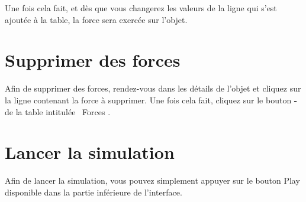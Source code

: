 \documentclass[11pt]{report}
\begin{document}
Une fois cela fait, et dès que vous changerez les valeurs de la ligne qui s'est ajoutée à la table, la force sera exercée sur l'objet.

\section{Supprimer des forces}

Afin de supprimer des forces, rendez-vous dans les détails de l'objet et cliquez sur la ligne contenant la force à supprimer. Une fois cela fait,
cliquez sur le bouton \textbf{-} de la table intitulée \flqq\ Forces \frqq.

\section{Lancer la simulation}

Afin de lancer la simulation, vous pouvez simplement appuyer sur le bouton Play disponible dans la partie inférieure de l'interface.
\end{document}
